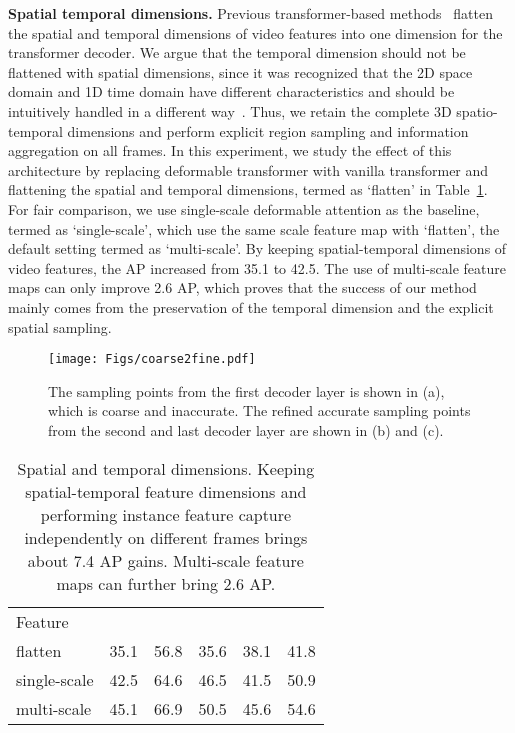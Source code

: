 \documentclass[runningheads]{llncs}
\begin{document}
\noindent\textbf{Spatial temporal dimensions.}
Previous transformer-based methods~\cite{VisTR,IFC} flatten the spatial and temporal dimensions of video features into one dimension for the transformer decoder. We argue that the temporal dimension should not be flattened with spatial dimensions, since it was recognized that the 2D space domain and 1D time domain have different characteristics and should be intuitively handled in a different way~\cite{zhao2018trajectory}. Thus, we retain the complete 3D spatio-temporal dimensions and perform explicit region sampling and information aggregation on all frames. In this experiment, we study the effect of this architecture by replacing deformable transformer with vanilla transformer and flattening the spatial and temporal dimensions, termed as `flatten' in Table~\ref{ablation_decoder}. For fair comparison, we use single-scale deformable attention as the baseline, termed as `single-scale', which use the same scale feature map with `flatten', the default setting termed as `multi-scale'.
By keeping spatial-temporal dimensions of video features, the AP increased from 35.1 to 42.5. The use of multi-scale feature maps can only improve 2.6 AP, which proves that the success of our method mainly comes from the preservation of the temporal dimension and the explicit spatial sampling.



\begin{figure}[tb]
\centering
\texttt{[image: Figs/coarse2fine.pdf]}
\caption{The sampling points from the first decoder layer is shown in (a), which is coarse and inaccurate. The refined accurate sampling points from the second and last decoder layer are shown in (b) and (c). }
\label{coase_to_fine}
\end{figure}


\setlength{\tabcolsep}{4pt}
\begin{table}[tb]
\begin{center}
\caption{Spatial and temporal dimensions. Keeping spatial-temporal feature dimensions and performing instance feature capture independently on different frames brings about 7.4 AP gains. Multi-scale feature maps can further bring 2.6 AP. }
\label{ablation_decoder}
\begin{tabular}{lccccc}
\hline\noalign{\smallskip}
Feature    &  &  & &  &  \\
\noalign{\smallskip}
\hline
\noalign{\smallskip}
flatten          &35.1  &56.8  &35.6  &38.1  &41.8\\
single-scale     &42.5  &64.6  &46.5  &41.5  &50.9\\
multi-scale      &45.1  &66.9  &50.5  &45.6  &54.6\\
\hline
\end{tabular}
\end{center}
\end{table}
\setlength{\tabcolsep}{1.4pt}
\end{document}
